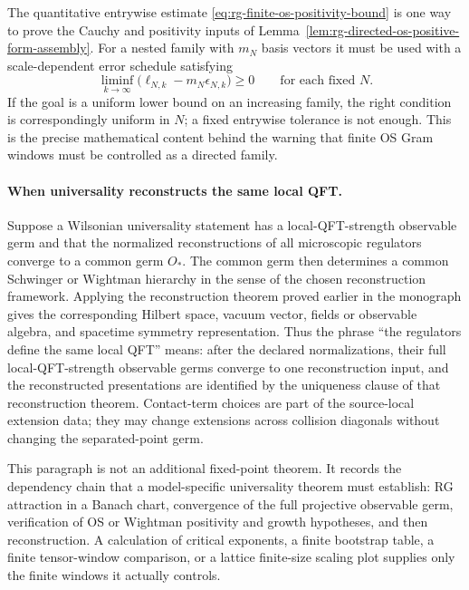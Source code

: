 The quantitative entrywise estimate
\eqref{eq:rg-finite-os-positivity-bound} is one way to prove the Cauchy and
positivity inputs of Lemma~\ref{lem:rg-directed-os-positive-form-assembly}.
For a nested family with \(m_N\) basis vectors it must be used with a
scale-dependent error schedule satisfying
\[
  \liminf_{k\to\infty}\bigl(\ell_{N,k}-m_N\epsilon_{N,k}\bigr)\ge0
  \qquad\text{for each fixed }N.
\]
If the goal is a uniform lower bound on an increasing family, the right
condition is correspondingly uniform in \(N\); a fixed entrywise tolerance is
not enough.  This is the precise mathematical content behind the warning
that finite OS Gram windows must be controlled as a directed family.

\paragraph{When universality reconstructs the same local QFT.}
Suppose a Wilsonian universality statement has a local-QFT-strength
observable germ and that the normalized reconstructions of all microscopic
regulators converge to a common germ \(O_\ast\).  The common germ then
determines a common Schwinger or Wightman hierarchy in the sense of the
chosen reconstruction framework.  Applying the reconstruction theorem
proved earlier in the monograph gives the corresponding Hilbert space,
vacuum vector, fields or observable algebra, and spacetime symmetry
representation.  Thus the phrase ``the regulators define the same local QFT''
means: after the declared normalizations, their full local-QFT-strength
observable germs converge to one reconstruction input, and the reconstructed
presentations are identified by the uniqueness clause of that reconstruction
theorem.  Contact-term choices are part of the source-local extension data;
they may change extensions across collision diagonals without changing the
separated-point germ.

This paragraph is not an additional fixed-point theorem.  It records the
dependency chain that a model-specific universality theorem must establish:
RG attraction in a Banach chart, convergence of the full projective
observable germ, verification of OS or Wightman positivity and growth
hypotheses, and then reconstruction.  A calculation of critical exponents,
a finite bootstrap table, a finite tensor-window comparison, or a lattice
finite-size scaling plot supplies only the finite windows it actually
controls.

